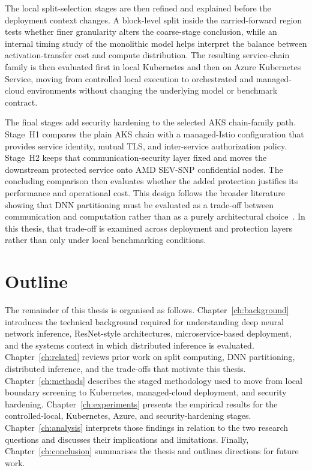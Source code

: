 The local split-selection stages are then refined and explained before the deployment context changes. A block-level split inside the carried-forward region tests whether finer granularity alters the coarse-stage conclusion, while an internal timing study of the monolithic model helps interpret the balance between activation-transfer cost and compute distribution. The resulting service-chain family is then evaluated first in local Kubernetes and then on Azure Kubernetes Service, moving from controlled local execution to orchestrated and managed-cloud environments without changing the underlying model or benchmark contract.

The final stages add security hardening to the selected AKS chain-family path. Stage~H1 compares the plain AKS chain with a managed-Istio configuration that provides service identity, mutual TLS, and inter-service authorization policy. Stage~H2 keeps that communication-security layer fixed and moves the downstream protected service onto AMD SEV-SNP confidential nodes. The concluding comparison then evaluates whether the added protection justifies its performance and operational cost. This design follows the broader literature showing that DNN partitioning must be evaluated as a trade-off between communication and computation rather than as a purely architectural choice~\cite{ga_partitioning, fine_grained_partitioning, delay_aware_inference}. In this thesis, that trade-off is examined across deployment and protection layers rather than only under local benchmarking conditions.

\section{Outline}
The remainder of this thesis is organised as follows. Chapter~\ref{ch:background} introduces the technical background required for understanding deep neural network inference, ResNet-style architectures, microservice-based deployment, and the systems context in which distributed inference is evaluated. Chapter~\ref{ch:related} reviews prior work on split computing, DNN partitioning, distributed inference, and the trade-offs that motivate this thesis. Chapter~\ref{ch:methods} describes the staged methodology used to move from local boundary screening to Kubernetes, managed-cloud deployment, and security hardening. Chapter~\ref{ch:experiments} presents the empirical results for the controlled-local, Kubernetes, Azure, and security-hardening stages. Chapter~\ref{ch:analysis} interprets those findings in relation to the two research questions and discusses their implications and limitations. Finally, Chapter~\ref{ch:conclusion} summarises the thesis and outlines directions for future work.
